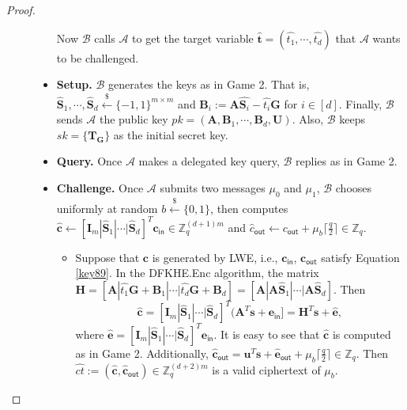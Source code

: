 \documentclass[runningheads,10pt]{llncs}
\begin{document}
\begin{proof}
\begin{description}
\begin{itemize}
			Now
			$\mathcal{B}$ calls $\mathcal{A}$ to get the target variable $\widehat{\mathbf{t}}=(\widehat{t_1}, \cdots, \widehat{t_d})$ that $\mathcal{A}$ wants to be challenged.


			
						\item \textbf{Setup.}   
			$\mathcal{B}$ generates the keys as in Game 2. 
			That is,  $\widehat{\textbf{S}}_1, \cdots, \widehat{\textbf{S}}_{d} \xleftarrow{\$} \{-1,1\}^{m \times m}$ and 
			$\textbf{B}_i:=\textbf{A}\widehat{\textbf{S}_i}-\widehat{t_i}\textbf{G}$  for $i\in [d]$. 
			Finally, $\mathcal{B}$ sends $\mathcal{A}$ the public key $pk=(\textbf{A}, \textbf{B}_1, \cdots, \textbf{B}_d, \textbf{U})$. Also, $\mathcal{B}$ 
			keeps $sk=\{\textbf{T}_\textbf{G}\}$ as the initial secret key.
			\item \textbf{Query.} Once $\mathcal{A}$ makes a  delegated key query, $\mathcal{B}$ replies as in Game 2.
			\item \textbf{Challenge.} Once $\mathcal{A}$ submits two messages $\mu_0$ and $\mu_1$, $\mathcal{B}$ chooses uniformly at random $b \xleftarrow{\$} \{0,1\}$, then computes 
			$\widehat{\textbf{c}}\leftarrow [\textbf{I}_m|\widehat{\textbf{S}}_1|\cdots|\widehat{\textbf{S}}_{d}]^T\textbf{c}_\textsf{in} \in \mathbb{Z}_q^{(d+1)m}$  and $\widehat{c}_{\textsf{out}} \leftarrow c_{\textsf{out}}+\mu_b \lceil \frac{q}{2} \rceil \in \mathbb{Z}_q$.
			\begin{itemize}
				\item  Suppose that $\textbf{c}$ is generated by LWE, 
				i.e.,  $\textbf{c}_{\textsf{in}}$, $ \textbf{c}_{\textsf{out}}$ satisfy Equation \eqref{key89}. In the \textsf{DFKHE.Enc} algorithm,
				the matrix $\textbf{H}=[\textbf{A}|\widehat{t_1}\textbf{G}+\textbf{B}_1|\cdots |\widehat{t_d} \textbf{G}+\textbf{B}_d]=[\textbf{A}|\textbf{A}\widehat{\textbf{S}}_1|\cdots|\textbf{A}\widehat{\textbf{S}}_d]$. Then 
				$$
				\widehat{\textbf{c}}= [\textbf{I}_m|\widehat{\textbf{S}}_1|\cdots|\widehat{\textbf{S}}_{d}]^T(\textbf{A}^T\textbf{s}+\textbf{e}_\textsf{in}]=\textbf{H}^T\textbf{s}+\widehat{\textbf{e}}, 
				$$
				where $\widehat{\textbf{e}}=[\textbf{I}_m|\widehat{\textbf{S}}_1|\cdots|\widehat{\textbf{S}}_{d}]^T\textbf{e}_\textsf{in}$. 
				It is easy to see that $\widehat{\textbf{c}}$ is computed as in Game 2. 	Additionally, $\widehat{\textbf{c}}_{\textsf{out}} =\textbf{u}^T \textbf{s}+\widehat{\textbf{e}}_{\textsf{out}}+\mu_b \lceil \frac{q}{2} \rceil \in \mathbb{Z}_q$. Then $\widehat{ct}:=(\widehat{\textbf{c}}, \widehat{\textbf{c}}_{\textsf{out}} ) \in \mathbb{Z}_q^{(d+2)m}$ is a valid ciphertext of $\mu_b$. 
				

\end{itemize}
\end{itemize}
\end{description}
\end{proof}
\end{document}
